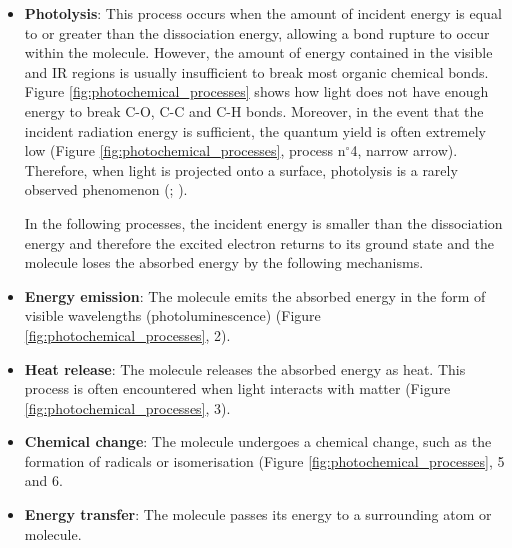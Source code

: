 \begin{itemize}
    \item \textbf{Photolysis}: This process occurs when the amount of incident energy is equal to or greater than the dissociation energy, allowing a bond rupture to occur within the molecule. However, the amount of energy contained in the visible and \gls{IR} regions is usually insufficient to break most organic chemical bonds. Figure \ref{fig:photochemical_processes} shows how light does not have enough energy to break C-O, C-C and C-H bonds. Moreover, in the event that the incident radiation energy is sufficient, the quantum yield is often extremely low (Figure \ref{fig:photochemical_processes}, process n$^\circ$4, narrow arrow). Therefore, when light is projected onto a surface, photolysis is a rarely observed phenomenon (\citealp[51]{feller_accelerated_1994}; \citealp[178]{brill_light_1980}).

    In the following processes, the incident energy is smaller than the dissociation energy and therefore the excited electron returns to its ground state and the molecule loses the absorbed energy by the following mechanisms.\\

    \item \textbf{Energy emission}: The molecule emits the absorbed energy in the form of visible wavelengths (photoluminescence) (Figure \ref{fig:photochemical_processes}, 2). 
    
    \item \textbf{Heat release}: The molecule releases the absorbed energy as heat. This process is often encountered when light interacts with matter (Figure \ref{fig:photochemical_processes}, 3).

    \item \textbf{Chemical change}: The molecule undergoes a chemical change, such as the formation of radicals or isomerisation (Figure \ref{fig:photochemical_processes}, 5 and 6. 
    
    \item \textbf{Energy transfer}: The molecule passes its energy to a surrounding atom or molecule.
\end{itemize}


